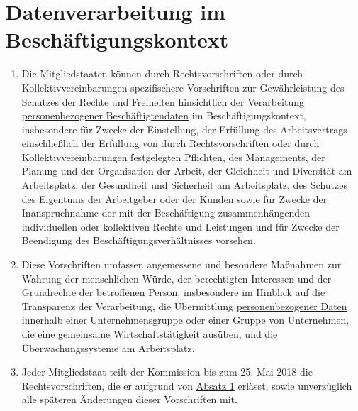 \chapter{Datenverarbeitung im Beschäftigungskontext}
\label{ch:88}


\begin{enumerate}

  \item Die Mitgliedstaaten können durch Rechtsvorschriften oder durch Kollektivvereinbarungen spezifischere
   Vorschriften zur Gewährleistung des Schutzes der Rechte und Freiheiten hinsichtlich der Verarbeitung
   \hyperref[itm:04-1]{personenbezogener Beschäftigtendaten} im Beschäftigungskontext, insbesondere für Zwecke der Einstellung, der
   Erfüllung des Arbeitsvertrags einschließlich der Erfüllung von durch Rechtsvorschriften oder durch
   Kollektivvereinbarungen festgelegten Pflichten, des Managements, der Planung und der Organisation der Arbeit, der
   Gleichheit und Diversität am Arbeitsplatz, der Gesundheit und Sicherheit am Arbeitsplatz, des Schutzes des Eigentums
   der Arbeitgeber oder der Kunden sowie für Zwecke der Inanspruchnahme der mit der Beschäftigung zusammenhängenden
   individuellen oder kollektiven Rechte und Leistungen und für Zwecke der Beendigung des Beschäftigungsverhältnisses
   vorsehen.
  \label{itm:88-1}

  \item Diese Vorschriften umfassen angemessene und besondere Maßnahmen zur Wahrung der menschlichen Würde, der
   berechtigten Interessen und der Grundrechte der \hyperref[itm:04-1]{betroffenen Person}, insbesondere im Hinblick auf die Transparenz der
   Verarbeitung, die Übermittlung \hyperref[itm:04-1]{personenbezogener Daten} innerhalb einer Unternehmensgruppe oder einer Gruppe von
   Unternehmen, die eine gemeinsame Wirtschaftstätigkeit ausüben, und die Überwachungssysteme am Arbeitsplatz.
  \label{itm:88-2}

  \item Jeder Mitgliedstaat teilt der Kommission bis zum 25. Mai 2018 die Rechtsvorschriften, die er aufgrund von
   \hyperref[itm:88-1]{Absatz 1} erlässt, sowie unverzüglich alle späteren Änderungen dieser Vorschriften mit.
  \label{itm:88-3}

\end{enumerate}


